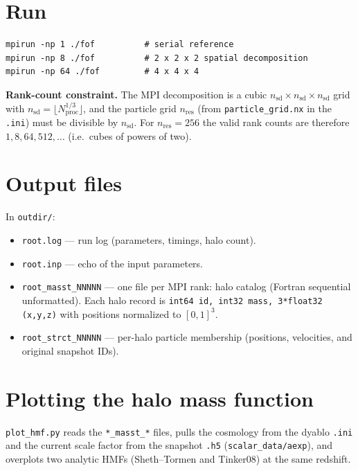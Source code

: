 \documentclass[11pt,a4paper]{article}
\begin{document}
\section{Run}

\begin{lstlisting}
mpirun -np 1 ./fof          # serial reference
mpirun -np 8 ./fof          # 2 x 2 x 2 spatial decomposition
mpirun -np 64 ./fof         # 4 x 4 x 4
\end{lstlisting}

\noindent\textbf{Rank-count constraint.} The MPI decomposition is a cubic
$n_{\mathrm{sd}}\times n_{\mathrm{sd}}\times n_{\mathrm{sd}}$ grid with
$n_{\mathrm{sd}}=\lfloor N_{\mathrm{proc}}^{1/3}\rfloor$, and the particle grid
$n_{\mathrm{res}}$ (from \texttt{particle\_grid.nx} in the \texttt{.ini}) must
be divisible by $n_{\mathrm{sd}}$. For $n_{\mathrm{res}}=256$ the valid rank
counts are therefore $1, 8, 64, 512, \ldots$ (i.e.\ cubes of powers of two).

\section{Output files}

In \texttt{outdir/}:
\begin{itemize}\itemsep0pt
  \item \texttt{root.log} --- run log (parameters, timings, halo count).
  \item \texttt{root.inp} --- echo of the input parameters.
  \item \texttt{root\_masst\_NNNNN} --- one file per MPI rank: halo catalog
        (Fortran sequential unformatted). Each halo record is
        \texttt{int64 id, int32 mass, 3*float32 (x,y,z)} with positions
        normalized to $[0,1]^3$.
  \item \texttt{root\_strct\_NNNNN} --- per-halo particle membership (positions,
        velocities, and original snapshot IDs).
\end{itemize}

\section{Plotting the halo mass function}

\texttt{plot\_hmf.py} reads the \texttt{*\_masst\_*} files, pulls the cosmology
from the dyablo \texttt{.ini} and the current scale factor from the snapshot
\texttt{.h5} (\texttt{scalar\_data/aexp}), and overplots two analytic HMFs
(Sheth--Tormen and Tinker08) at the same redshift.
\end{document}
